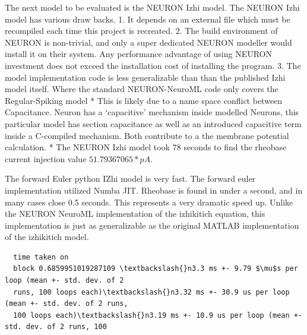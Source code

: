 The next model to be evaluated is the NEURON Izhi model. The NEURON Izhi model has various draw backs. 1. It depends on an external file which must be recompiled each time this project is recreated. 2. The build environment of NEURON is non-trivial, and only a super dedicated NEURON modeller would install it on their system. Any performance advantage of using NEURON investment does not exceed the installation cost of installing the program. 3. The model implementation code is less generalizable than than the published Izhi model itself. Where the standard NEURON-NeuroML code only covers the Regular-Spiking model * This is likely due to a name space conflict between Capacitance. Neuron has a `capacitive' mechanism inside modelled Neurons, this particular model has section capacitance as well as an introduced capacitive term inside a C-compiled mechanism. Both contribute to a the membrane
potential calculation. * The NEURON Izhi model took $78$ seconds to find the rheobase current injection value $ 51.79367065 * pA $.

    





        
The forward Euler python IZhi model is very fast. The forward euler
implementation utilized Numba JIT. Rheobase is found in under a second,
and in many cases close 0.5 seconds. This represents a very dramatic
speed up. Unlike the NEURON NeuroML implementation of the izhikitich equation,
this implementation is just as generalizable as the original MATLAB
implementation of the izhikitich model.


\begin{verbatim}
  time taken on
  block 0.6859951019287109 \textbackslash{}n3.3 ms +- 9.79 $\mu$s per loop (mean +- std. dev. of 2
  runs, 100 loops each)\textbackslash{}n3.32 ms +- 30.9 us per loop (mean +- std. dev. of 2 runs,
  100 loops each)\textbackslash{}n3.19 ms +- 10.9 us per loop (mean +- std. dev. of 2 runs, 100

\end{verbatim}
        
